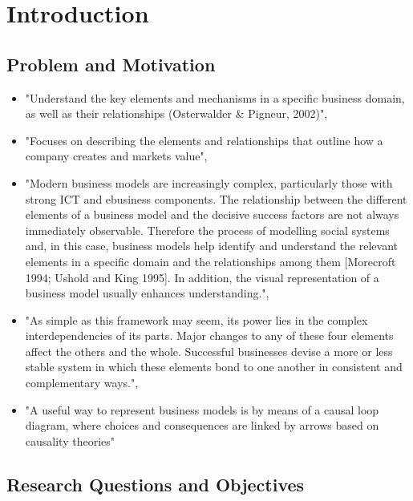 \chapter{Introduction}\label{ch:intro}

\section{Problem and Motivation}\label{ch:intro:mo}

\begin{itemize}
	\item "Understand the key elements and mechanisms in a specific business domain, as well as their relationships (Osterwalder \& Pigneur, 2002)", \citep[p. 303]{Pateli2004}
	\item "Focuses on describing the elements and relationships that outline how a company creates and markets value", \citep[p. 7]{Osterwalder2005}
	\item "Modern business models are increasingly complex, particularly those with strong ICT and ebusiness components. The relationship between the different elements of a business model and the decisive success factors are not always immediately observable. Therefore the process of modelling social systems and, in this case, business models help identify and understand the relevant elements in a specific domain and the relationships among them [Morecroft 1994; Ushold and King 1995]. In addition, the visual representation of a business model usually enhances understanding.", \citep[p. 14]{Osterwalder2005}
	\item "As simple as this framework may seem, its power lies in the complex interdependencies of its parts. Major changes to any of these four elements affect the others and the whole. Successful businesses devise a more or less stable system in which these elements bond to one another in consistent and complementary ways.", \citep[p. 53]{Johnson2008}
	\item "A useful way to represent business models is by means of a causal loop diagram, where choices and consequences are linked by arrows based on causality theories" \citep[p. 198]{Casadesus-Masanell2010}
\end{itemize}


\section{Research Questions and Objectives}\label{ch:intro:ro}

